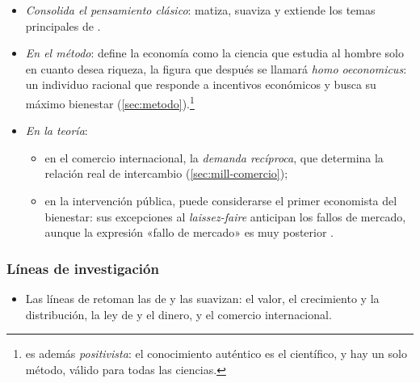 \documentclass[11pt]{article}
\begin{document}
\begin{itemize}
\begin{itemize}
  \item \emph{Consolida el pensamiento clásico}: matiza, suaviza y extiende los temas principales de .
  \item \emph{En el método}: define la economía como la ciencia que estudia al hombre solo en cuanto desea riqueza, la figura que después se llamará \emph{homo oeconomicus}: un individuo racional que responde a incentivos económicos y busca su máximo bienestar (\ref{sec:metodo}).\footnote{ es además \emph{positivista}: el conocimiento auténtico es el científico, y hay un solo método, válido para todas las ciencias.}
  \item \emph{En la teoría}:
    \begin{itemize}
    \item en el comercio internacional, la \emph{demanda recíproca}, que determina la relación real de intercambio (\ref{sec:mill-comercio});
    \item en la intervención pública, puede considerarse el primer economista del bienestar: sus excepciones al \emph{laissez-faire} anticipan los fallos de mercado, aunque la expresión «fallo de mercado» es muy posterior\nocite{Bator1958Anatomy} .
    \end{itemize}
  \end{itemize}
\end{itemize}

\subsubsection{Líneas de investigación}\label{sec:mill-lineas}

\begin{itemize}
\item Las líneas de  retoman las de  y las suavizan: el valor, el crecimiento y la distribución, la ley de  y el dinero, y el comercio internacional.
\end{itemize}
\end{document}
